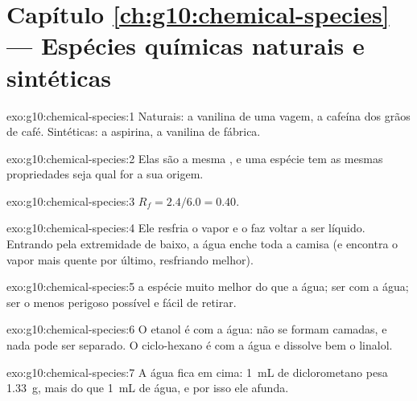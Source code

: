 \section*{Capítulo \ref{ch:g10:chemical-species} --- Espécies químicas naturais e sintéticas}

\begin{solution}{exo:g10:chemical-species:1}
Naturais: a vanilina de uma vagem, a cafeína dos grãos de café.
Sintéticas: a aspirina, a vanilina de fábrica.
\end{solution}

\begin{solution}{exo:g10:chemical-species:2}
Elas são a mesma , e uma espécie tem as mesmas
propriedades seja qual for a sua origem.
\end{solution}

\begin{solution}{exo:g10:chemical-species:3}
$R_f = 2.4/6.0 = 0.40$.
\end{solution}

\begin{solution}{exo:g10:chemical-species:4}
Ele resfria o vapor e o faz voltar a ser líquido. Entrando pela
extremidade de baixo, a água enche toda a camisa (e encontra o vapor mais
quente por último, resfriando melhor).
\end{solution}

\begin{solution}{exo:g10:chemical-species:5}
 a espécie muito melhor do que a água; ser  com a
água; ser o menos perigoso possível e fácil de retirar.
\end{solution}

\begin{solution}{exo:g10:chemical-species:6}
O etanol é  com a água: não se formam camadas, e nada pode ser
separado. O ciclo-hexano é  com a água e dissolve bem o linalol.
\end{solution}

\begin{solution}{exo:g10:chemical-species:7}
A água fica em cima: \qty{1}{mL} de diclorometano pesa \qty{1.33}{g},
mais do que \qty{1}{mL} de água, e por isso ele afunda.
\end{solution}


